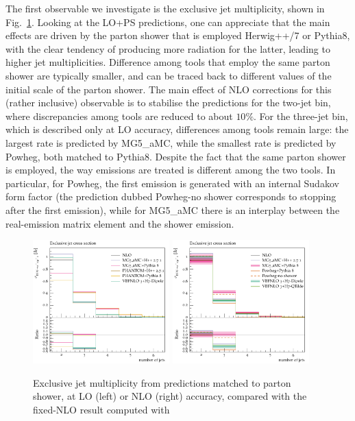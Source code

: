The first observable we investigate is the exclusive jet multiplicity, shown in Fig.~\ref{fig:PSnjet}. Looking at the LO+PS predictions, one can appreciate that the
main effects are driven by the parton shower that is employed {\sc Herwig++/7} or {\sc Pythia8}, with the clear tendency of producing more radiation for the latter,
leading to higher jet multiplicities. Difference among tools that employ the same parton shower are typically smaller, and can be traced back to different values of the
initial scale of the parton shower. The main effect of NLO corrections for this (rather inclusive) observable is to stabilise the predictions for the two-jet bin, where discrepancies
among tools are reduced to about $10\%$. For the three-jet bin, which is described only at LO accuracy, differences among tools remain large: the largest rate is predicted by
{\sc MG5\_aMC}, while the smallest rate is predicted by {\sc Powheg}, both matched to {\sc Pythia8}. Despite the fact that the same parton shower is employed, the way emissions are treated
is different among the two tools. In particular, for {\sc Powheg}, the first emission is generated with an internal Sudakov form factor (the
prediction dubbed {\sc Powheg-no shower} corresponds to stopping after the first emission), while for {\sc MG5\_aMC} there is an
interplay between the real-emission matrix element and the shower emission.

\begin{figure}[hbt]
\centering
\includegraphics[width=0.47\textwidth]{figures/LOPS/jetsexclusive.pdf}
\includegraphics[width=0.47\textwidth]{figures/NLOPS/jetsexclusive.pdf}
\caption{Exclusive jet multiplicity from predictions matched to parton shower, at LO (left) or NLO (right) accuracy, compared with the fixed-NLO result
    computed with }
\label{fig:PSnjet}
\end{figure}
 
